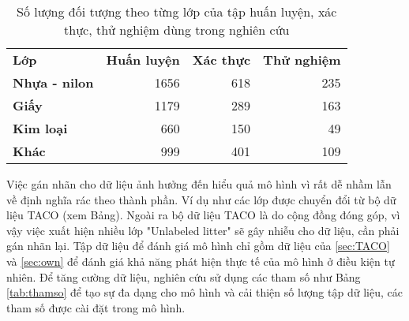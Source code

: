 \documentclass[../the.tex]{subfiles}
\begin{document}
\begin{table}[!h]
	\centering
	\caption{Số lượng đối tượng theo từng lớp của tập huấn luyện, xác thực, thử nghiệm dùng trong nghiên cứu}
	\begin{tabular}{|l|r|r|r|}
		\cline{1-4}
		\textbf{Lớp}          & \textbf{Huấn luyện} & \textbf{Xác thực} & \textbf{Thử nghiệm} \\ \cline{1-4}
		\textbf{Nhựa - nilon} & 1656                & 618               & 235                 \\ \cline{1-4}
		\textbf{Giấy}         & 1179                & 289               & 163                 \\ \cline{1-4}
		\textbf{Kim loại}     & 660                 & 150               & 49                  \\ \cline{1-4}
		\textbf{Khác}         & 999                 & 401               & 109                 \\ \cline{1-4}
	\end{tabular}

	\label{tab:datasettest}
\end{table}

{\fontsize{13}{12} \selectfont

Việc gán nhãn cho dữ liệu ảnh hưởng đến hiểu quả mô hình vì rất dễ nhầm lẫn về định nghĩa rác theo thành phần. Ví dụ như các lớp được chuyển đổi từ bộ dữ liệu TACO (xem Bảng).
Ngoài ra bộ dữ liệu TACO là do cộng đồng đóng góp, vì vậy việc xuất hiện nhiều lớp "Unlabeled litter" sẽ gây nhiễu cho dữ liệu, cần phải gán nhãn lại.
Tập dữ liệu để đánh giá mô hình chỉ gồm dữ liệu của \ref{sec:TACO} và \ref{sec:own} để đánh giá khả năng phát hiện thực tế của mô hình ở điều kiện tự nhiên.
Để tăng cường dữ liệu, nghiên cứu sử dụng các tham số như Bảng \ref{tab:thamso} để tạo sự đa dạng cho mô hình và cải thiện số lượng tập dữ liệu, các tham số được cài đặt trong mô hình.

}
\end{document}
